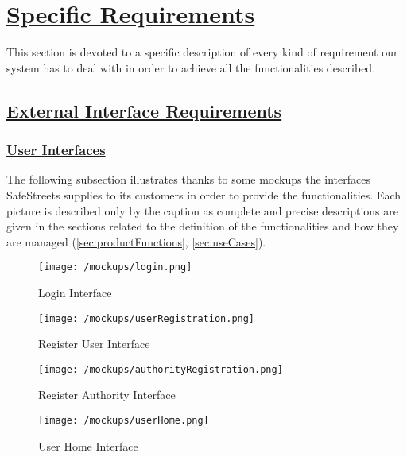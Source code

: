 \section[Specific Requirements]{\hyperlink{toc}{Specific Requirements}}
	\label{sec:specificRequirements}
	This section is devoted to a specific description of every kind of requirement our system has to deal with in order to achieve all the functionalities described.

\subsection[External Interface Requirements]{\hyperlink{toc}{External Interface Requirements}}
	\label{sec:externalInterfaceRequirements}
	\subsubsection[User Interfaces]{\hyperlink{toc}{User Interfaces}}
	\label{sec:userInterfaces}
	The following subsection illustrates thanks to some mockups the interfaces SafeStreets supplies to its customers in order to provide the functionalities. Each picture is described only by the caption as complete and precise descriptions are given in the sections related to the definition of the functionalities and how they are managed (\ref{sec:productFunctions}, \ref{sec:useCases}).
	
	\begin{figure}[h]
		\centering
		\begin{minipage}{0.5\textwidth}
			\centering
			\texttt{[image: /mockups/login.png]}
			\caption{Login Interface}
		\end{minipage}\hfill
		\begin{minipage}{0.5\textwidth}
			\centering
			\texttt{[image: /mockups/userRegistration.png]}
			\caption{Register User Interface}
		\end{minipage}
	\end{figure}

	\begin{figure}[h]
		\centering
		\begin{minipage}{0.5\textwidth}
			\centering
			\texttt{[image: /mockups/authorityRegistration.png]}
			\caption{Register Authority Interface}
		\end{minipage}\hfill
		\begin{minipage}{0.5\textwidth}
			\centering
			\texttt{[image: /mockups/userHome.png]}
			\caption{User Home Interface}
		\end{minipage}
	\end{figure}

